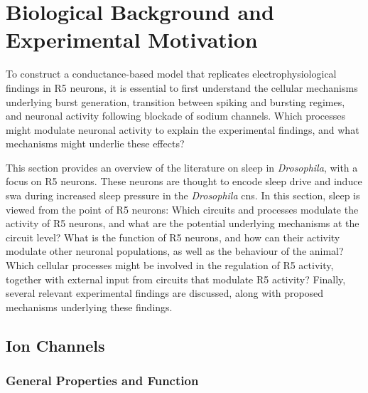 \documentclass[../main.tex]{subfiles}
\begin{document}

\section{Biological Background and Experimental Motivation} \label{sec:sleep_and_r5_network}


To construct a conductance-based model that replicates electrophysiological findings in R5 neurons, it is essential to first understand the cellular mechanisms underlying burst generation, transition between spiking and bursting regimes, and neuronal activity following blockade of sodium channels.
Which processes might modulate neuronal activity to explain the experimental findings, and what mechanisms might underlie these effects?

This section provides an overview of the literature on sleep in \textit{Drosophila}, with a focus on R5 neurons. These neurons are thought to encode sleep drive and induce \gls{swa} during increased sleep pressure in the \textit{Drosophila}
\gls{cns}. In this section, sleep is viewed from the point of R5 neurons: Which circuits and processes modulate the activity of R5 neurons, and what are the potential underlying mechanisms at the circuit level? What is the function of R5 neurons, and how can their activity modulate other neuronal populations, as well as the behaviour of the animal? Which cellular processes might be involved in the regulation of R5 activity, together with external input from circuits that modulate R5 activity? Finally, several relevant experimental findings are discussed, along with proposed mechanisms underlying these findings.


\subsection{Ion Channels} \label{subsec:ion_channels}
\subsubsection{General Properties and Function}\label{subsubsec:ion_channel_properties_and_function}
\end{document}
